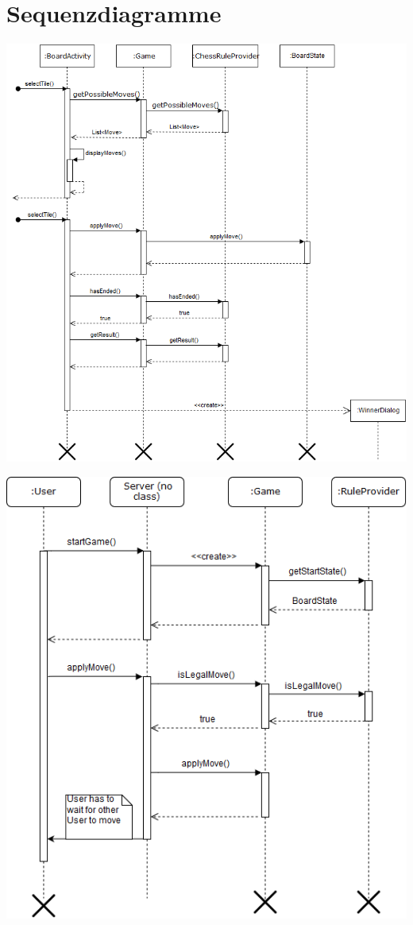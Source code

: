 \documentclass[parskip=full]{scrartcl}
\begin{document}
	\section{Sequenzdiagramme}
	\begin{minipage}{\linewidth}
		\centering
		\includegraphics[width=1\linewidth]{Diagramme/MoveClient}
		\label{fig:sequenzdiagramm1}
	\end{minipage}
\begin{minipage}{\linewidth}
	\centering
	\includegraphics[width=1\linewidth]{Diagramme/MoveServer}
	\label{fig:sequenzdiagramm2}
\end{minipage}
\end{document}
